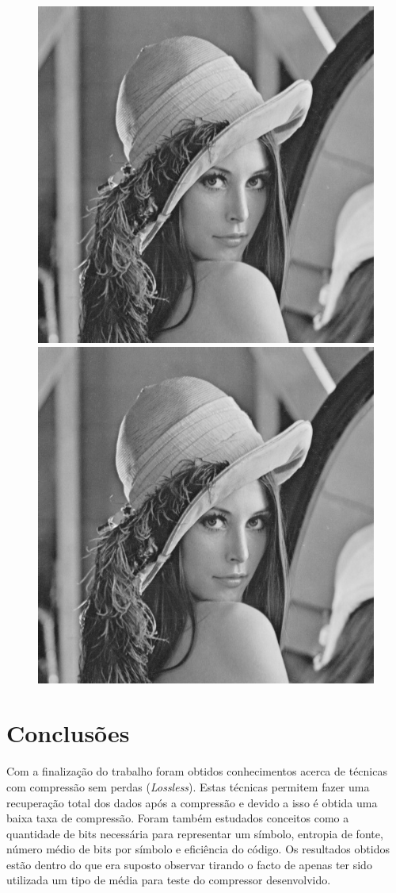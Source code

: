 \documentclass[12pt,a4paper]{article}
\begin{document}
\begin{figure}[h]
\centering
\begin{minipage}{.5\textwidth}
  \centering
  \includegraphics[width=.5\linewidth]{lenagrey}
\end{minipage}%
\begin{minipage}{.5\textwidth}
  \centering
  \includegraphics[width=.5\linewidth]{lenagrey}
\end{minipage}
\end{figure}
\newpage

\section{Conclusões}
Com a finalização do trabalho foram obtidos conhecimentos acerca de técnicas com compressão sem perdas (\textit{Lossless}). Estas técnicas permitem fazer uma recuperação total dos dados após a compressão e devido a isso é obtida uma baixa taxa de compressão. Foram também estudados conceitos como a quantidade de bits necessária para representar um símbolo, entropia de fonte, número médio de bits por símbolo e eficiência do código. Os resultados obtidos estão dentro do que era suposto observar tirando o facto de apenas ter sido utilizada um tipo de média para teste do compressor desenvolvido.
\end{document}
